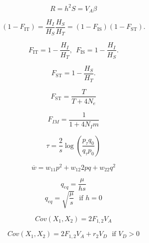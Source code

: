 \documentclass[12pt,twocolumn]{article}
\newcommand{\fis}{F_{\mathrm{IS}}}
\newcommand{\fit}{F_{\mathrm{IT}}}
\newcommand{\fst}{F_{\mathrm{ST}}}
\begin{document}
\begin{equation}
R = h^2 S = V_A \beta \nonumber
\end{equation}


\begin{equation}
(1-\fit) =\frac{H_I}{H_S} \frac{H_S}{H_T}=(1-\fis)(1-\fst).\nonumber
\label{eqn:F_relationships}
\end{equation}

\begin{equation}
\fit =1-\frac{H_I}{H_T},~~\fis =1-\frac{H_I}{H_S}.\nonumber
\end{equation}

\begin{equation}
\fst =1-\frac{H_S}{H_T}.\nonumber
\end{equation}

\begin{equation}
  \fst = \frac{ T}{ T + 4N_e } \nonumber
\end{equation}

\begin{equation}
  F_{IM} = \frac{1}{1 + 4N_I m} \nonumber
\end{equation}


\begin{equation}
	\tau = \frac{2}{s} \log \left(\frac{p_{\tau} q_0}{q_{\tau}
            p_0}\right) \nonumber
\end{equation}

\begin{equation}
\overline{w} = w_{11}p^2+w_{12}2pq+w_{22}q^2  \nonumber
\end{equation}

\begin{equation}
q_{eq} = \frac{\mu}{hs}  \nonumber
\end{equation}
\begin{equation}
q_{eq} =\sqrt{\frac{\mu}{s}}~~~\textrm{if } h=0 \nonumber
\end{equation}

\begin{equation}
Cov(X_1,X_2)  = 2 F_{1,2} V_A  \nonumber
\end{equation}

\begin{equation}
Cov(X_1,X_2)  = 2F_{1,2} V_A + r_2 V_D~~~\textrm{if } V_D>0  \nonumber
\end{equation}
\end{document}
